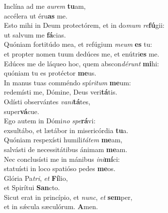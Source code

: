 \evenverse Inclína ad me \textit{au}\textit{rem} \textbf{tu}am,~\*\\
\evenverse accélera ut éru\textbf{as} me.\\
\oddverse Esto mihi in Deum protectórem, et in do\textit{mum} \textit{re}\textbf{fú}gii:~\*\\
\oddverse ut salvum me \textbf{fá}cias.\\
\evenverse Quóniam fortitúdo mea, et refúgium \textit{me}\textit{um} \textbf{es} tu:~\*\\
\evenverse et propter nomen tuum dedúces me, et enútri\textbf{es} me.\\
\oddverse Edúces me de láqueo hoc, quem abscon\textit{dé}\textit{runt} \textbf{mi}hi:~\*\\
\oddverse quóniam tu es protéctor \textbf{me}us.\\
\evenverse In manus tuas comméndo spí\textit{ri}\textit{tum} \textbf{me}um:~\*\\
\evenverse redemísti me, Dómine, Deus veri\textbf{tá}tis.\\
\oddverse Odísti observántes \textit{va}\textit{ni}\textbf{tá}tes,~\*\\
\oddverse super\textbf{vá}cue.\\
\evenverse Ego autem in Dómi\textit{no} \textit{spe}\textbf{rá}vi:~\*\\
\evenverse exsultábo, et lætábor in misericórdia \textbf{tu}a.\\
\oddverse Quóniam respexísti humili\textit{tá}\textit{tem} \textbf{me}am,~\*\\
\oddverse salvásti de necessitátibus ánimam \textbf{me}am.\\
\evenverse Nec conclusísti me in mánibus \textit{i}\textit{ni}\textbf{mí}ci:~\*\\
\evenverse statuísti in loco spatióso pedes \textbf{me}os.\\
\oddverse Glória Pa\textit{tri}, \textit{et} \textbf{Fí}lio,~\*\\
\oddverse et Spirítui \textbf{San}cto.\\
\evenverse Sicut erat in princípio, et \textit{nunc}, \textit{et} \textbf{sem}per,~\*\\
\evenverse et in sǽcula sæculórum. \textbf{A}men.\\
